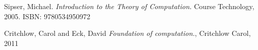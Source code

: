 \documentclass[12pt]{article}
\begin{document}



\vfill
\begin{thebibliography}{9}
Sipser, Michael. 
\textit{Introduction to the Theory of Computation.}
Course Technology, 2005. ISBN: 9780534950972

Critchlow, Carol and Eck, David
\textit{Foundation of computation.},
Critchlow Carol, 2011
\end{thebibliography}


 
\end{document}
